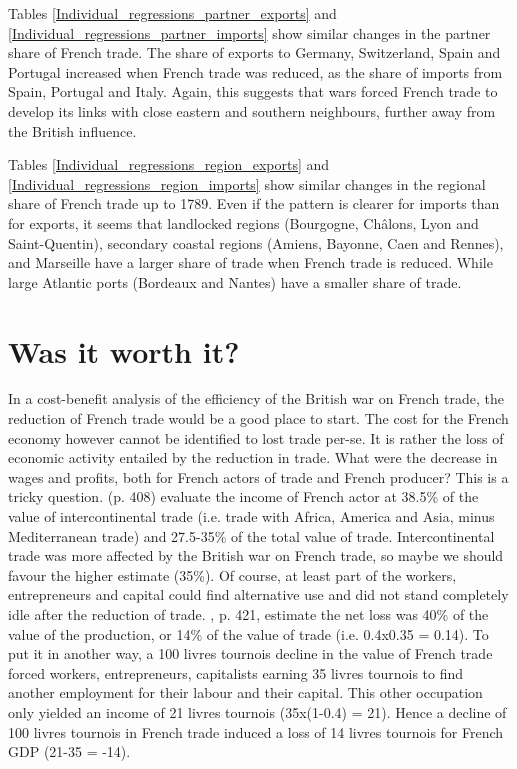 \documentclass[12pt,a4paper,notitlepage,english]{article}
\begin{document}
Tables \ref{Individual_regressions_partner_exports} and \ref{Individual_regressions_partner_imports} show similar changes in the partner share of French trade.
The share of exports to Germany, Switzerland, Spain and Portugal increased when French trade was reduced, as the share of imports from Spain, Portugal and Italy. 
Again, this suggests that wars forced French trade to develop its links with close eastern and southern neighbours, further away from the British influence.

Tables \ref{Individual_regressions_region_exports} and \ref{Individual_regressions_region_imports} show similar changes in the regional share of French trade up to 1789.
Even if the pattern is clearer for imports than for exports, it seems that landlocked regions (Bourgogne, Châlons, Lyon and Saint-Quentin), secondary coastal regions (Amiens, Bayonne, Caen and Rennes), and Marseille have a larger share of trade when French trade is reduced.
While large Atlantic ports (Bordeaux and Nantes) have a smaller share of trade.

 

\section{Was it worth it?}
\label{sec:cost_benefit}
In a cost-benefit analysis of the efficiency of the British war on French trade, the reduction of French trade would be a good place to start. 
The cost for the French economy however cannot be identified to lost trade per-se.
It is rather the loss of economic activity entailed by the reduction in trade.
What were the decrease in wages and profits, both for French actors of trade and French producer?
This is a tricky question.
\cite{Daudin2005} (p. 408) evaluate the income of French actor at 38.5\% of the value of intercontinental trade (i.e. trade with Africa, America and Asia, minus Mediterranean trade) and 27.5-35\% of the total value of trade.
Intercontinental trade was more affected by the British war on French trade, so maybe we should favour the higher estimate (35\%).
Of course, at least part of the workers, entrepreneurs and capital could find alternative use and did not stand completely idle after the reduction of trade. 
\cite{Daudin2005}, p. 421, estimate the net loss was 40\% of the value of the production, or 14\% of the value of trade (i.e. 0.4x0.35 = 0.14). 
To put it in another way, a 100 livres tournois decline in the value of French trade forced workers, entrepreneurs, capitalists earning 35 livres tournois to find another employment for their labour and their capital. This other occupation only yielded an income of 21 livres tournois (35x(1-0.4) = 21).
Hence a decline of 100 livres tournois in French trade induced a loss of 14 livres tournois for French GDP (21-35 = -14). 
\end{document}
